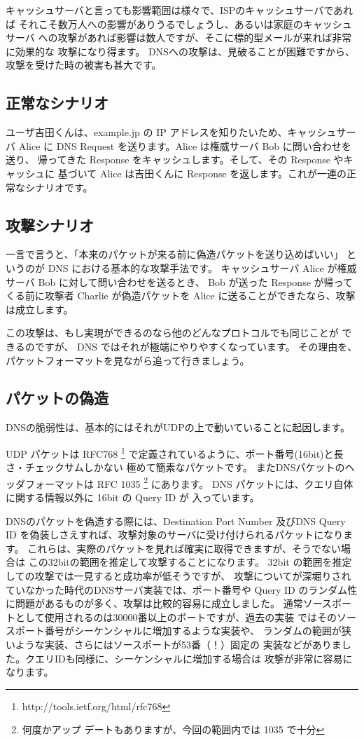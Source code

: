 キャッシュサーバと言っても影響範囲は様々で、ISPのキャッシュサーバであれば
それこそ数万人への影響がありうるでしょうし、あるいは家庭のキャッシュサーバ
への攻撃があれば影響は数人ですが、そこに標的型メールが来れば非常に効果的な
攻撃になり得ます。
DNSへの攻撃は、見破ることが困難ですから、攻撃を受けた時の被害も甚大です。

\subsection{正常なシナリオ}
ユーザ吉田くんは、example.jp の IP アドレスを知りたいため、キャッシュサーバ
Alice に DNS Request を送ります。Alice は権威サーバ Bob に問い合わせを送り、
帰ってきた Response をキャッシュします。そして、その Response やキャッシュに
基づいて Alice は吉田くんに Response を返します。これが一連の正常なシナリオです。

\subsection{攻撃シナリオ}
一言で言うと、「本来のパケットが来る前に偽造パケットを送り込めばいい」
というのが DNS における基本的な攻撃手法です。
キャッシュサーバ Alice が権威サーバ Bob に対して問い合わせを送るとき、
Bob が送った Response が帰ってくる前に攻撃者 Charlie が偽造パケットを
Alice に送ることができたなら、攻撃は成立します。

この攻撃は、もし実現ができるのなら他のどんなプロトコルでも同じことが
できるのですが、 DNS ではそれが極端にやりやすくなっています。
その理由を、パケットフォーマットを見ながら追って行きましょう。

\subsection{パケットの偽造}
DNSの脆弱性は、基本的にはそれがUDPの上で動いていることに起因します。


UDP パケットは RFC768 \footnote{http://tools.ietf.org/html/rfc768}
で定義されているように、ポート番号(16bit)と長さ・チェックサムしかない
極めて簡素なパケットです。
またDNSパケットのヘッダフォーマットは RFC 1035 \footnote{何度かアップ
デートもありますが、今回の範囲内では 1035 で十分} にあります。
DNS パケットには、クエリ自体に関する情報以外に 16bit の Query ID が
入っています。

DNSのパケットを偽造する際には、Destination Port Number 及びDNS Query
ID を偽装しさえすれば、攻撃対象のサーバに受け付けられるパケットになります。
これらは、実際のパケットを見れば確実に取得できますが、そうでない場合は
この32bitの範囲を推定して攻撃することになります。
32bit の範囲を推定しての攻撃では一見すると成功率が低そうですが、
攻撃についてが深堀りされていなかった時代のDNSサーバ実装では、ポート番号や
Query ID のランダム性に問題があるものが多く、攻撃は比較的容易に成立しました。
通常ソースポートとして使用されるのは30000番以上のポートですが、過去の実装
ではそのソースポート番号がシーケンシャルに増加するような実装や、
ランダムの範囲が狭いような実装、さらにはソースポートが53番（！）固定の
実装などがありました。クエリIDも同様に、シーケンシャルに増加する場合は
攻撃が非常に容易になります。

